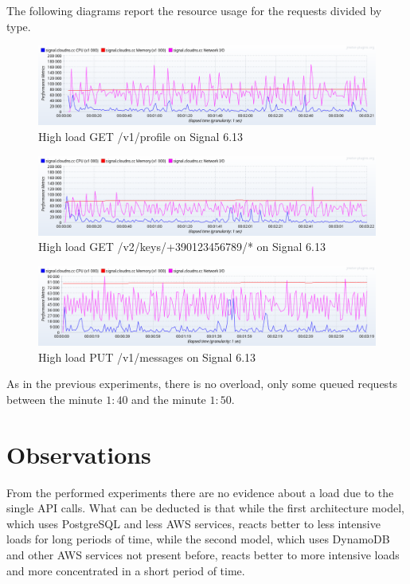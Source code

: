 The following diagrams report the resource usage for the requests divided by type.

\begin{figure}[H]
    \centering
    \includegraphics[width=\textwidth]{images/613/message-load-1}
    \caption{High load GET /v1/profile on Signal 6.13}
    \label{fig:signalload1newmessage}
\end{figure}


\begin{figure}[H]
    \centering
    \includegraphics[width=\textwidth]{images/613/message-load-2}
    \caption{High load GET /v2/keys/+390123456789/* on Signal 6.13}
    \label{fig:signalload2newmessage}
\end{figure}


\begin{figure}[H]
    \centering
    \includegraphics[width=\textwidth]{images/613/message-load-3}
    \caption{High load PUT /v1/messages on Signal 6.13}
    \label{fig:signalload3newmessage}
\end{figure}

As in the previous experiments, there is no overload, only some queued requests between the minute $1:40$ and the minute $1:50$.

\section{Observations\label{sec:observations}}

From the performed experiments there are no evidence about a load due to the single API calls.
What can be deducted is that while the first architecture model, which uses PostgreSQL and less AWS services, reacts better to less intensive loads for long periods of time, while the second model, which uses DynamoDB and other AWS services not present before, reacts better to more intensive loads and more concentrated in a short period of time.

